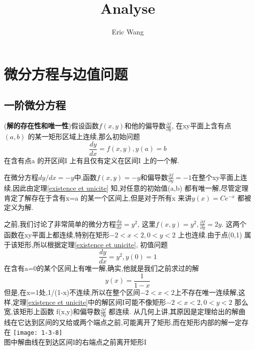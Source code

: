 \documentclass{book}
\begin{document}
\title{Analyse}
\author{Eric Wang}

\maketitle
\tableofcontents
\newpage

\chapter{微分方程与边值问题}
\section{一阶微分方程}
\begin{theorem}
  ({\bf 解的存在性和唯一性})假设函数$f(x,y)$和他的偏导数$\frac{\partial f}{\partial y}$, 在xy平面上含有点$(a,b)$ 的某一矩形区域上连续,那么初始问题
  \begin{equation}
    \frac{dy}{dx}=f(x,y),y(a)=b
  \end{equation}
  在含有点a 的开区间I 上有且仅有定义在区间I 上的一个解.
  \label{existence et unicite}
\end{theorem}
\begin{example}
  在微分方程$dy/dx=-y$中,函数$f(x,y)=-y$和偏导数$\frac{\partial f}{\partial y}=-1$在整个xy平面上连续,因此由定理\ref{existence et unicite} 知,对任意的初始值(a,b) 都有唯一解,尽管定理肯定了解存在于含有x=a 的某一个区间上,但是对于所有x 来讲$y(x)=Ce^{-x}$ 都被定义为解.
\end{example}
\begin{note}
  之前,我们讨论了非常简单的微分方程$\frac{dy}{dx}=y^2$, 这里$f(x,y)=y^2,\frac{\partial f}{\partial y}=2y$. 这两个函数在xy平面上都连续,特别在矩形$-2<x<2,0<y<2 $ 上也连续.由于点(0,1) 属于该矩形,所以根据定理\ref{existence et unicite}, 初值问题
  \begin{equation}
    \frac{dy}{dx}=y^2,y(0)=1
  \end{equation}
  在含有a=0的某个区间上有唯一解,确实,他就是我们之前求过的解$$y(x)=\frac{1}{1-x}$$
  但是,在x=1处,1/(1-x)不连续,所以在整个区间$-2<x<2 $上不存在唯一连续解,这样,定理\ref{existence et unicite}中的解区间I可能不像矩形$-2<x<2,0<y<2$ 那么宽,该矩形上函数 f(x,y)和偏导数$\frac{\partial f}{\partial y}$ 都连续. 从几何上讲,其原因是定理给出的解曲线在它达到区间的又给或两个端点之前,可能离开了矩形,而在矩形内部的解一定存在 \newline
\texttt{[image: 1-3-8]}\\
图中解曲线在到达区间I的右端点之前离开矩形I
\end{note}
\end{document}
